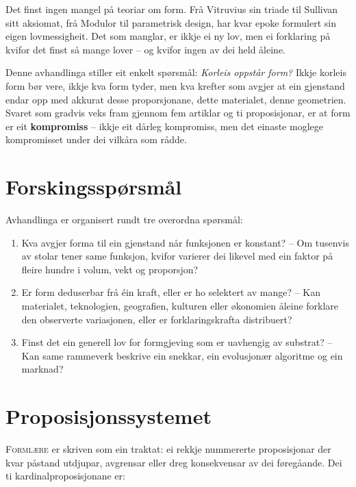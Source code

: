 \documentclass[12pt,a4paper,oneside]{report}
\begin{document}
Det finst ingen mangel på teoriar om form. Frå Vitruvius sin triade til Sullivan sitt aksiomat, frå Modulor til parametrisk design, har kvar epoke formulert sin eigen lovmessigheit. Det som manglar, er ikkje ei ny lov, men ei forklaring på kvifor det finst så mange lover -- og kvifor ingen av dei held åleine.

Denne avhandlinga stiller eit enkelt spørsmål: \emph{Korleis oppstår form?} Ikkje korleis form bør vere, ikkje kva form tyder, men kva krefter som avgjer at ein gjenstand endar opp med akkurat desse proporsjonane, dette materialet, denne geometrien. Svaret som gradvis veks fram gjennom fem artiklar og ti proposisjonar, er at form er eit \textbf{kompromiss} -- ikkje eit dårleg kompromiss, men det einaste moglege kompromisset under dei vilkåra som rådde.

\section{Forskingsspørsmål}

Avhandlinga er organisert rundt tre overordna spørsmål:

\begin{enumerate}[label=\textbf{FS\arabic*:}]
  \item Kva avgjer forma til ein gjenstand når funksjonen er konstant? -- Om tusenvis av stolar tener same funksjon, kvifor varierer dei likevel med ein faktor på fleire hundre i volum, vekt og proporsjon?
  \item Er form deduserbar frå éin kraft, eller er ho selektert av mange? -- Kan materialet, teknologien, geografien, kulturen eller økonomien åleine forklare den observerte variasjonen, eller er forklaringskrafta distribuert?
  \item Finst det ein generell lov for formgjeving som er uavhengig av substrat? -- Kan same rammeverk beskrive ein snekkar, ein evolusjonær algoritme og ein marknad?
\end{enumerate}

\section{Proposisjonssystemet}

\textsc{Formlære} er skriven som ein traktat: ei rekkje nummererte proposisjonar der kvar påstand utdjupar, avgrensar eller dreg konsekvensar av dei føregåande. Dei ti kardinalproposisjonane er:
\end{document}
